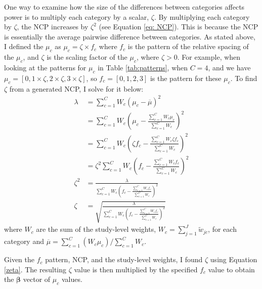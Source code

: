 One way to examine how the size of the differences between categories affects power is to multiply each category by a scalar, $\zeta$. By multiplying each category by $\zeta$, the NCP increases by $\zeta^2$ (see Equation \ref{eq: NCP}). This is because the NCP is essentially the average pairwise difference between categories. As stated above, I defined the $\mu_c$ as $\mu_c = \zeta \times f_c$ where $f_c$ is the pattern of the relative spacing of the $\mu_c$, and $\zeta$ is the scaling factor of the $\mu_c$, where $\zeta > 0$. For example, when looking at the patterns for $\mu_c$ in Table \ref{tab:patterns}, when $C=4$, and we have $\mu_c = [0, 1 \times \zeta, 2 \times \zeta, 3 \times \zeta]$, so $f_c = [0, 1, 2, 3]$ is the pattern for these $\mu_c$. To find $\zeta$ from a generated NCP, I solve for it below: 
\begin{equation}
    \label{zeta}
    \begin{split}
    \lambda &= \sum_{c=1}^C W_c (\mu_c - \overline{\mu})^2 \\
    &= \sum_{c=1}^C W_c \left(\mu_c - \frac{\sum_{c=1}^C W_c \mu_c}{\sum_{c=1}^C W_c}\right)^2 \\
    &= \sum_{c=1}^C W_c \left(\zeta f_c - \frac{\sum_{c=1}^C W_c \zeta f_c}{\sum_{c=1}^C W_c}\right)^2 \\
    &= \zeta^2\sum_{c=1}^C W_c \left(f_c - \frac{\sum_{c=1}^C W_c  f_c}{\sum_{c=1}^C W_c}\right)^2 \\
    \zeta^2 &= \frac{\lambda}{\sum_{c=1}^C W_c \left(f_c - \frac{\sum_{c=1}^C W_c f_c}{\sum_{c=1}^C W_c}\right)^2 } \\
    \zeta &= \sqrt{ \frac{\lambda}{\sum_{c=1}^C W_c \left(f_c - \frac{\sum_{c=1}^C W_c f_c}{\sum_{c=1}^C W_c}\right)^2} }
    \end{split}
\end{equation}
where  $W_c$ are the sum of the study-level weights, $W_c = \sum_{j=1}^J \tilde{w}_{jc}$, for each category and $\overline{\mu} = \sum_{c=1}^C (W_c \mu_c)/\sum_{c=1}^C W_c$. 

Given the $f_c$ pattern, NCP, and the study-level weights, I found $\zeta$ using Equation \ref{zeta}. The resulting $\zeta$ value is then multiplied by the specified $f_c$ value to obtain the $\bm{\beta}$ vector of $\mu_c$ values. 



